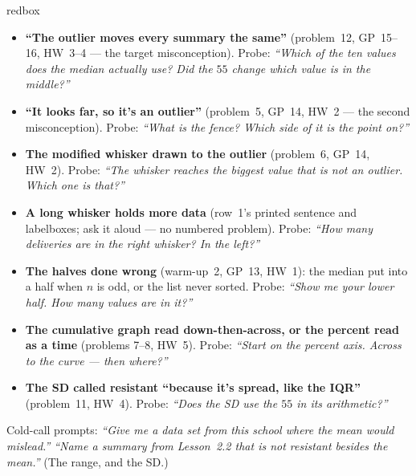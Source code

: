 \documentclass[10pt]{article}
\begin{document}
\boxguard
\begin{skillbox}{redbox}
\begin{itemize}[leftmargin=1.2em, nosep]
  \item \textbf{``The outlier moves every summary the same''} (problem~12, GP~15--16,
        HW~3--4 --- the target misconception). Probe: \emph{``Which of the ten values does the
        median actually use? Did the $55$ change which value is in the middle?''}
  \item \textbf{``It looks far, so it's an outlier''} (problem~5, GP~14, HW~2 --- the second
        misconception). Probe: \emph{``What is the fence? Which side of it is the point on?''}
  \item \textbf{The modified whisker drawn to the outlier} (problem~6, GP~14, HW~2). Probe:
        \emph{``The whisker reaches the biggest value that is \emph{not} an outlier. Which one
        is that?''}
  \item \textbf{A long whisker holds more data} (row~1's printed sentence and labelboxes; ask it
        aloud --- no numbered problem). Probe: \emph{``How many deliveries are in the right
        whisker? In the left?''}
  \item \textbf{The halves done wrong} (warm-up~2, GP~13, HW~1): the median put into a half when
        $n$ is odd, or the list never sorted. Probe: \emph{``Show me your lower half. How many
        values are in it?''}
  \item \textbf{The cumulative graph read down-then-across, or the percent read as a time}
        (problems 7--8, HW~5). Probe: \emph{``Start on the percent axis. Across to the curve ---
        then where?''}
  \item \textbf{The SD called resistant ``because it's spread, like the IQR''} (problem~11,
        HW~4). Probe: \emph{``Does the SD use the $55$ in its arithmetic?''}
\end{itemize}
Cold-call prompts: \emph{``Give me a data set from this school where the mean would mislead.''}
\quad \emph{``Name a summary from Lesson~2.2 that is \emph{not} resistant besides the mean.''}
(The range, and the SD.)
\end{skillbox}
\end{document}
